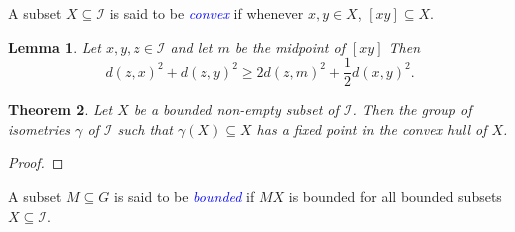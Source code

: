 \documentclass{article}
\theoremstyle{thmstyle}
\newtheorem{theorem}{Theorem}[section]
\newtheorem{lemma}[theorem]{Lemma}
\theoremstyle{defstyle}
\newcommand{\scrI}{\mathscr{I}}
\newcommand{\define}[1]{\textcolor{blue}{\textit{#1}}}
\renewcommand{\ge}{\geqslant}
\begin{document}
A subset $X\subseteq\scrI$ is said to be \define{convex} if whenever $x, y\in X$, $[xy]\subseteq X$.

\begin{lemma}
    Let $x, y, z\in\scrI$ and let $m$ be the midpoint of $[xy]$ Then 
    \begin{equation*}
        d(z, x)^2 + d(z, y)^2\ge 2d(z, m)^2 + \frac{1}{2}d(x, y)^2.
    \end{equation*}
\end{lemma}

\begin{theorem}
    Let $X$ be a bounded non-empty subset of $\scrI$. Then the group of isometries $\gamma$ of $\scrI$ such that $\gamma(X)\subseteq X$ has a fixed point in the convex hull of $X$.
\end{theorem}
\begin{proof}
\end{proof}

A subset $M\subseteq G$ is said to be \define{bounded} if $MX$ is bounded for all bounded subsets $X\subseteq\scrI$.




\end{document}
